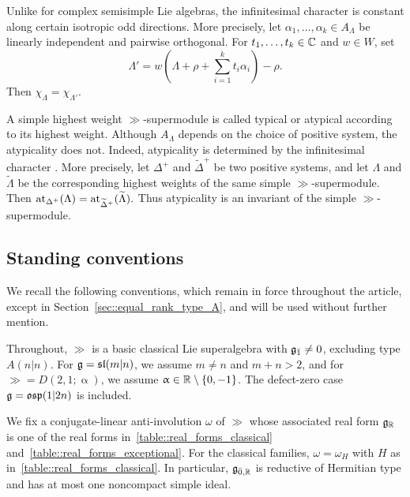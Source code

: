 Unlike for complex semisimple Lie algebras, the infinitesimal character is constant along certain isotropic odd directions. More precisely, let $\alpha_1,\ldots,\alpha_k\in A_\Lambda$ be linearly independent and pairwise orthogonal. For $t_1,\ldots,t_k\in\CC$ and $w\in W$, set
\begin{equation}
\Lambda'
=
w\left(\Lambda+\rho+\sum_{i=1}^k t_i\alpha_i\right)-\rho.
\end{equation}
Then
$
\chi_\Lambda=\chi_{\Lambda'}.
$

A simple highest weight $\gg$-supermodule is called typical or atypical according to its highest weight. Although $A_\Lambda$ depends on the choice of positive system,
the atypicality does not. Indeed, atypicality is determined
by the infinitesimal character
\cite[Lemmas~5.1--5.2]{duflo2005associated}. More precisely, let $\Delta^+$ and $\widetilde{\Delta}^+$ be two positive systems, and let $\Lambda$ and $\widetilde{\Lambda}$ be the corresponding highest weights of the same simple $\gg$-supermodule. Then
$
\at_{\Delta^+}(\Lambda)=\at_{\widetilde{\Delta}^+}(\widetilde{\Lambda}).
$ Thus atypicality is an invariant of the simple $\gg$-supermodule.


\subsection{Standing conventions}\label{subsec::conventions}
\noindent
We recall the following conventions, which remain in force throughout the article, except in Section~\ref{sec::equal_rank_type_A}, and will be used without further mention.

Throughout, $\gg$ is a basic classical Lie superalgebra with $\odd\neq0$, excluding type $A(n\vert n)$. For $\gg=\sl(m\vert n)$, we assume $m\neq n$ and $m+n>2$, and for $\gg=D(2,1;\upalpha)$, we assume $\upalpha\in\RR\setminus\{0,-1\}$. The defect-zero case $\gg=\osp(1\vert2n)$ is included.

We fix a conjugate-linear anti-involution $\omega$ of $\gg$ whose associated real form $\gg_{\RR}$ is one of the real forms in~\eqref{table::real_forms_classical} and~\eqref{table::real_forms_exceptional}. For the classical families, $\omega=\omega_H$ with $H$ as in~\eqref{table::real_forms_classical}. In particular, $\gg_{\bar0,\RR}$ is reductive of Hermitian type and has at most one noncompact simple ideal.

